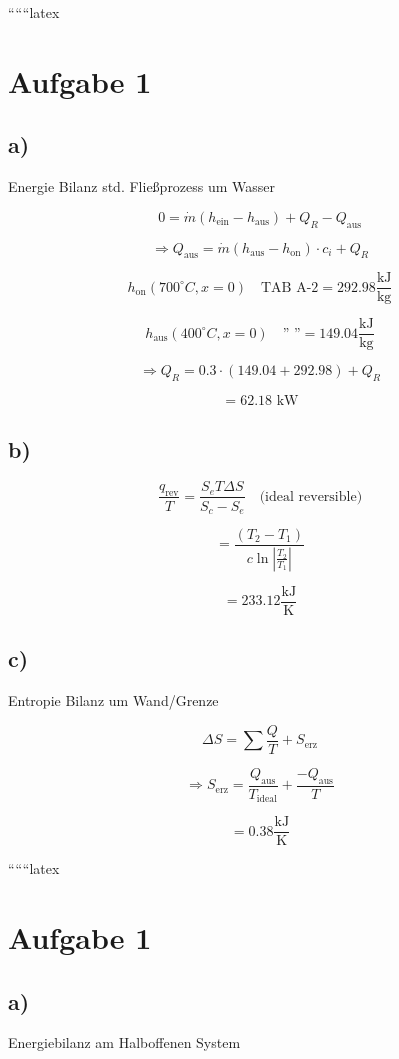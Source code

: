 
``````latex


\section*{Aufgabe 1}

\subsection*{a)}
Energie Bilanz std. Fließprozess um Wasser

\[
0 = \dot{m} (h_{\text{ein}} - h_{\text{aus}}) + Q_R - Q_{\text{aus}}
\]

\[
\Rightarrow Q_{\text{aus}} = \dot{m} (h_{\text{aus}} - h_{\text{on}}) \cdot c_i + Q_R
\]

\[
h_{\text{on}} (700^\circ C, x=0) \quad \text{TAB A-2} = 292.98 \frac{\text{kJ}}{\text{kg}}
\]

\[
h_{\text{aus}} (400^\circ C, x=0) \quad \text{'' ''} = 149.04 \frac{\text{kJ}}{\text{kg}}
\]

\[
\Rightarrow Q_R = 0.3 \cdot (149.04 + 292.98) + Q_R
\]

\[
= 62.18 \text{ kW}
\]

\subsection*{b)}
\[
\frac{q_{\text{rev}}}{T} = \frac{S_e T \Delta S}{S_c - S_e} \quad \text{(ideal reversible)}
\]

\[
= \frac{(T_2 - T_1)}{c \ln \left| \frac{T_2}{T_1} \right|}
\]

\[
= 233.12 \frac{\text{kJ}}{\text{K}}
\]

\subsection*{c)}
Entropie Bilanz um Wand/Grenze

\[
\Delta S = \sum \frac{Q}{T} + S_{\text{erz}}
\]

\[
\Rightarrow S_{\text{erz}} = \frac{Q_{\text{aus}}}{T_{\text{ideal}}} + \frac{-Q_{\text{aus}}}{T}
\]

\[
= 0.38 \frac{\text{kJ}}{\text{K}}
\]

``````latex


\section*{Aufgabe 1}

\subsection*{a)}
Energiebilanz am Halboffenen System

